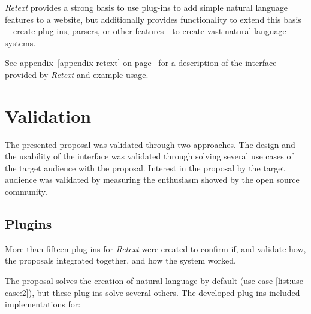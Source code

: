 \emph{Retext} provides a strong basis to use plug-ins to add simple natural
  language features to a website, but additionally provides functionality to
  extend this basis---create plug-ins, parsers, or other features---to
  create vast natural language systems.

\medskip \noindent See appendix~\ref{appendix-retext} on
  page~\pageref{appendix-retext} for a description of the interface
  provided by \emph{Retext} and example usage.

\chapter{Validation}\label{validation}

The presented proposal was validated through two approaches.
The design and the usability of the interface was validated through
  solving several use cases of the target audience with the proposal.
Interest in the proposal by the target audience was validated by
  measuring the enthusiasm showed by the open source community.

\section{Plugins}\label{plugins}

More than fifteen plug-ins for \emph{Retext} were created to confirm if,
  and validate how, the proposals integrated together, and how the system
  worked.

The proposal solves the creation of natural language by default (use case
  \ref{list:use-case:2}), but these plug-ins solve several others.
The developed plug-ins included implementations for:

